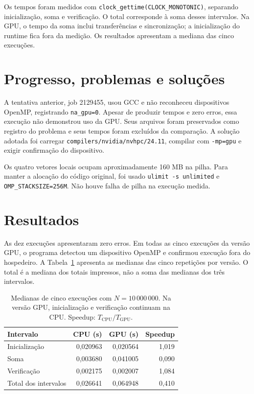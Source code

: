\documentclass[11pt,letterpaper]{article}
\begin{document}
Os tempos foram medidos com \texttt{clock\_gettime(CLOCK\_MONOTONIC)}, separando inicialização, soma e verificação. O total corresponde à soma desses intervalos. Na GPU, o tempo da soma inclui transferências e sincronização; a inicialização do runtime fica fora da medição. Os resultados apresentam a mediana das cinco execuções.

\section{Progresso, problemas e soluções}
A tentativa anterior, job 2129455, usou GCC e não reconheceu dispositivos OpenMP, registrando \texttt{na\_gpu=0}. Apesar de produzir tempos e zero erros, essa execução não demonstrou uso da GPU. Seus arquivos foram preservados como registro do problema e seus tempos foram excluídos da comparação. A solução adotada foi carregar \texttt{compilers/nvidia/nvhpc/24.11}, compilar com \texttt{-mp=gpu} e exigir confirmação do dispositivo.

Os quatro vetores locais ocupam aproximadamente 160 MB na pilha. Para manter a alocação do código original, foi usado \texttt{ulimit -s unlimited} e \texttt{OMP\_STACKSIZE=256M}. Não houve falha de pilha na execução medida.

\section{Resultados}
As dez execuções apresentaram zero erros. Em todas as cinco execuções da versão GPU, o programa detectou um dispositivo OpenMP e confirmou execução fora do hospedeiro. A Tabela~\ref{tab:tempos} apresenta as medianas das cinco repetições por versão. O total é a mediana dos totais impressos, não a soma das medianas dos três intervalos.

\begin{table}[H]
\centering
\begin{tabular}{lrrr}
\toprule
Intervalo & CPU (s) & GPU (s) & Speedup \\
\midrule
Inicialização & 0,020963 & 0,020564 & 1,019 \\
Soma & 0,003680 & 0,041005 & 0,090 \\
Verificação & 0,002175 & 0,002007 & 1,084 \\
Total dos intervalos & 0,026641 & 0,064948 & 0,410 \\
\bottomrule
\end{tabular}
\caption{Medianas de cinco execuções com $N=10\,000\,000$. Na versão GPU, inicialização e verificação continuam na CPU. Speedup: $T_{\mathrm{CPU}}/T_{\mathrm{GPU}}$.}
\label{tab:tempos}
\end{table}
\end{document}
